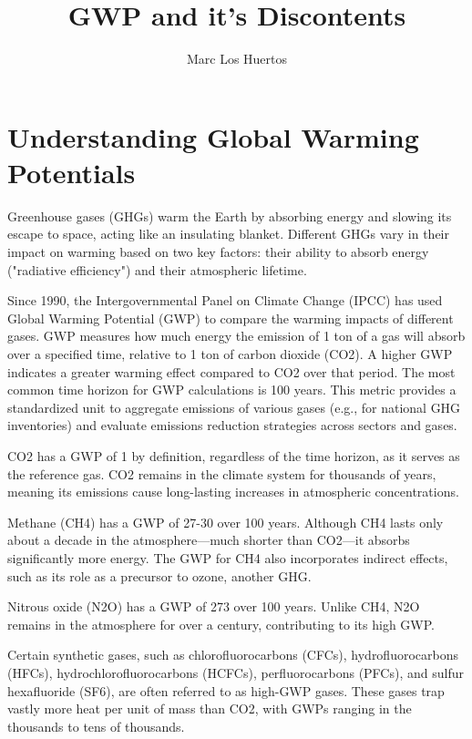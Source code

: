 \documentclass{tufte-handout}\usepackage[]{graphicx}\usepackage[]{xcolor}
\title{GWP and it's Discontents}
\author{Marc Los Huertos}
\begin{document}
\maketitle

\section{Understanding Global Warming Potentials}

Greenhouse gases (GHGs) warm the Earth by absorbing energy and slowing its escape to space, acting like an insulating blanket. Different GHGs vary in their impact on warming based on two key factors: their ability to absorb energy ("radiative efficiency") and their atmospheric lifetime.

Since 1990, the Intergovernmental Panel on Climate Change (IPCC) has used Global Warming Potential (GWP) to compare the warming impacts of different gases. GWP measures how much energy the emission of 1 ton of a gas will absorb over a specified time, relative to 1 ton of carbon dioxide (CO2). A higher GWP indicates a greater warming effect compared to CO2 over that period. The most common time horizon for GWP calculations is 100 years. This metric provides a standardized unit to aggregate emissions of various gases (e.g., for national GHG inventories) and evaluate emissions reduction strategies across sectors and gases.

CO2 has a GWP of 1 by definition, regardless of the time horizon, as it serves as the reference gas. CO2 remains in the climate system for thousands of years, meaning its emissions cause long-lasting increases in atmospheric concentrations.

Methane (CH4) has a GWP of 27-30 over 100 years. Although CH4 lasts only about a decade in the atmosphere—much shorter than CO2—it absorbs significantly more energy. The GWP for CH4 also incorporates indirect effects, such as its role as a precursor to ozone, another GHG.

Nitrous oxide (N2O) has a GWP of 273 over 100 years. Unlike CH4, N2O remains in the atmosphere for over a century, contributing to its high GWP.

Certain synthetic gases, such as chlorofluorocarbons (CFCs), hydrofluorocarbons (HFCs), hydrochlorofluorocarbons (HCFCs), perfluorocarbons (PFCs), and sulfur hexafluoride (SF6), are often referred to as high-GWP gases. These gases trap vastly more heat per unit of mass than CO2, with GWPs ranging in the thousands to tens of thousands.
\end{document}
